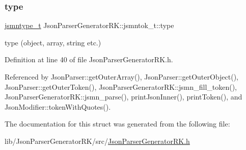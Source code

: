 \subsubsection{\texorpdfstring{type}{type}}
{\footnotesize\ttfamily \hyperlink{namespace_json_parser_generator_r_k_a45d8af9d310679633d258ed9b2caeeb3}{jsmntype\+\_\+t} Json\+Parser\+Generator\+R\+K\+::jsmntok\+\_\+t\+::type}



type (object, array, string etc.) 



Definition at line 40 of file Json\+Parser\+Generator\+R\+K.\+h.



Referenced by Json\+Parser\+::get\+Outer\+Array(), Json\+Parser\+::get\+Outer\+Object(), Json\+Parser\+::get\+Outer\+Token(), Json\+Parser\+Generator\+R\+K\+::jsmn\+\_\+fill\+\_\+token(), Json\+Parser\+Generator\+R\+K\+::jsmn\+\_\+parse(), print\+Json\+Inner(), print\+Token(), and Json\+Modifier\+::token\+With\+Quotes().



The documentation for this struct was generated from the following file\+:\begin{DoxyCompactItemize}
\item 
lib/\+Json\+Parser\+Generator\+R\+K/src/\hyperlink{_json_parser_generator_r_k_8h}{Json\+Parser\+Generator\+R\+K.\+h}\end{DoxyCompactItemize}
